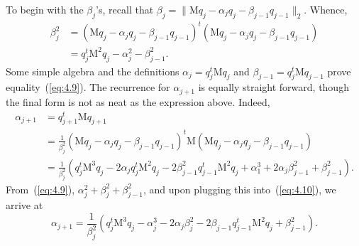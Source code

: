 \documentclass[12pt,letterpaper]{report}
\theoremstyle{plain}
\theoremstyle{definition}
\theoremstyle{remark}
\numberwithin{theorem}{chapter}
\numberwithin{claim}{chapter}
\numberwithin{equation}{chapter}
\numberwithin{conjecture}{chapter}
\newcommand\M{\ensuremath{\mathrm{M}}}
\newcommand\<{\ensuremath{\langle}}
\renewcommand\>{\ensuremath{\rangle}}
\begin{document}
To begin with the $\beta_j$'s, recall that 
$\beta_j = \|\M q_j - \alpha_jq_j - \beta_{j-1}q_{j-1}\|_2$. 
Whence,
\begin{align}
\label{eq:4.9}
\beta_j^2 &= (\M q_j - \alpha_jq_j - \beta_{j-1}q_{j-1})^t(\M q_j - \alpha_jq_j - \beta_{j-1}q_{j-1})\nonumber\\
&= q_j^t\M^2 q_j - \alpha_j^2 - \beta^2_{j-1}.
\end{align}
Some simple algebra and the definitions $\alpha_j = q_j^t\M q_j$ and
$\beta_{j-1} = q_j^t \M q_{j-1}$ prove equality~(\ref{eq:4.9}).  The
%
%
%
%
recurrence for $\alpha_{j+1}$ is equally straight forward, though the final form
is not as neat as the expression above. Indeed,
\begin{align}
\label{eq:4.10}
\alpha_{j+1} &= q_{j+1}^t \M q_{j+1} \nonumber\\
&= \frac{1}{\beta_j^2}(\M q_j - \alpha_j q_j - \beta_{j-1} q_{j-1})^t\M 
  (\M q_j - \alpha_j q_j - \beta_{j-1} q_{j-1})\nonumber\\
&= \frac{1}{\beta_j^2}(q_j^t\M^3 q_j 
    - 2\alpha_j q_j^t\M^2 q_j 
    - 2\beta^2_{j-1} q_{j-1}^t\M^2 q_j 
    + \alpha_1^3
    + 2\alpha_j \beta^2_{j-1} + \beta^2_{j-1}).
\end{align}
From~(\ref{eq:4.9}), $\alpha_j^2 +\beta_j^2 + \beta^2_{j-1}$,
and upon plugging this into~(\ref{eq:4.10}), we arrive at 
\begin{equation}
\label{eq:4.11}
\alpha_{j+1}= \frac{1}{\beta_j^2}(q_j^t\M^3 q_j 
    - \alpha_j^3
    - 2\alpha_j\beta^2_{j}
    - 2\beta_{j-1}q_{j-1}^t\M^2q_j + \beta^2_{j-1}).
\end{equation}
\end{document}
